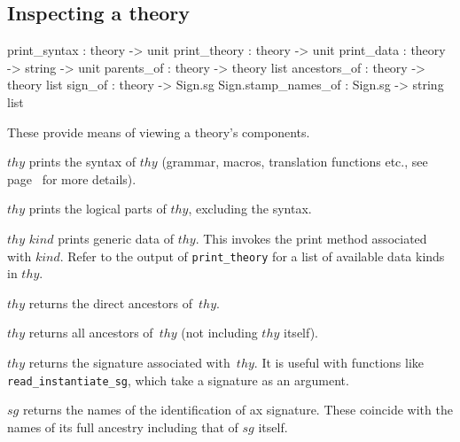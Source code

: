 \subsection{Inspecting a theory}\label{sec:inspct-thy}
\begin{ttbox}
print_syntax        : theory -> unit
print_theory        : theory -> unit
print_data          : theory -> string -> unit
parents_of          : theory -> theory list
ancestors_of        : theory -> theory list
sign_of             : theory -> Sign.sg
Sign.stamp_names_of : Sign.sg -> string list
\end{ttbox}
These provide means of viewing a theory's components.
\begin{ttdescription}
\item[\ttindexbold{print_syntax} $thy$] prints the syntax of $thy$
  (grammar, macros, translation functions etc., see
  page~\pageref{pg:print_syn} for more details).
  
\item[\ttindexbold{print_theory} $thy$] prints the logical parts of
  $thy$, excluding the syntax.
  
\item[\ttindexbold{print_data} $thy$ $kind$] prints generic data of
  $thy$.  This invokes the print method associated with $kind$.  Refer
  to the output of \texttt{print_theory} for a list of available data
  kinds in $thy$.
  
\item[\ttindexbold{parents_of} $thy$] returns the direct ancestors
  of~$thy$.
  
\item[\ttindexbold{ancestors_of} $thy$] returns all ancestors of~$thy$
  (not including $thy$ itself).
  
\item[\ttindexbold{sign_of} $thy$] returns the signature associated
  with~$thy$.  It is useful with functions like {\tt
    read_instantiate_sg}, which take a signature as an argument.
  
\item[\ttindexbold{Sign.stamp_names_of} $sg$]
  returns the names of the identification  of ax
  signature.  These coincide with the names of its full ancestry
  including that of $sg$ itself.

\end{ttdescription}


